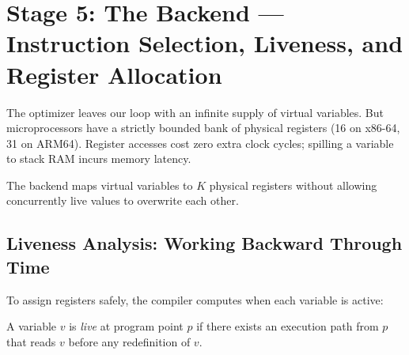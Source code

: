 \section{Stage 5: The Backend --- Instruction Selection, Liveness, and Register Allocation}
\label{ch41:backend}

The optimizer leaves our loop with an infinite supply of virtual variables. But
microprocessors have a strictly bounded bank of physical registers (16 on
x86-64, 31 on ARM64). Register accesses cost zero extra clock cycles; spilling a
variable to stack RAM incurs memory latency.

The backend maps virtual variables to $K$ physical registers without allowing
concurrently live values to overwrite each other.

\subsection{Liveness Analysis: Working Backward Through Time}

To assign registers safely, the compiler computes when each variable is active:

\begin{definition}
\label{ch41:def-liveness}
A variable $v$ is \emph{live} at program point $p$ if there exists an execution
path from $p$ that reads $v$ before any redefinition of $v$.
\end{definition}

